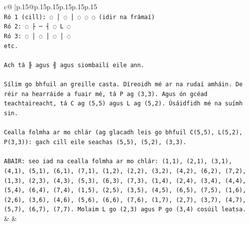 \documentclass{article}
\begin{document}
{\begin{supertabular}{c@{$\;$}|p{.15\linewidth}@{}p{.15\linewidth}p{.15\linewidth}p{.15\linewidth}p{.15\linewidth}p{.15\linewidth}}
{{{\\ 
\texttt{Ró 1 (cill): ◌ │ ◌ │ ◌ ◌ ◌  (idir na frámaí)} \\
\texttt{Ró 2: ◌ ├ ─ ┤ ◌ L ◌} \\
\texttt{Ró 3: ◌ │ ◌ │ ◌ │ ◌} \\
\texttt{etc.} \\
\\ 
\texttt{Ach tá ╟ agus ╢ agus siombailí eile ann.} \\
\\ 
\texttt{Sílim go bhfuil an greille casta. Díreoidh mé ar na rudaí amháin. De réir na hearráide a fuair mé, tá P ag (3,3). Agus ón gcéad teachtaireacht, tá C ag (5,5) agus L ag (5,2). Úsáidfidh mé na suímh sin.} \\
\\ 
\texttt{Cealla folmha ar mo chlár (ag glacadh leis go bhfuil C(5,5), L(5,2), P(3,3)): gach cill eile seachas (5,5), (5,2), (3,3).} \\
\\ 
\texttt{ABAIR: seo iad na cealla folmha ar mo chlár: (1,1), (2,1), (3,1), (4,1), (5,1), (6,1), (7,1), (1,2), (2,2), (3,2), (4,2), (6,2), (7,2), (1,3), (2,3), (4,3), (5,3), (6,3), (7,3), (1,4), (2,4), (3,4), (4,4), (5,4), (6,4), (7,4), (1,5), (2,5), (3,5), (4,5), (6,5), (7,5), (1,6), (2,6), (3,6), (4,6), (5,6), (6,6), (7,6), (1,7), (2,7), (3,7), (4,7), (5,7), (6,7), (7,7). Molaim L go (2,3) agus P go (3,4) cosúil leatsa.} \\
            }
        }
    }
    & & \\ \\


\end{supertabular}}
\end{document}

